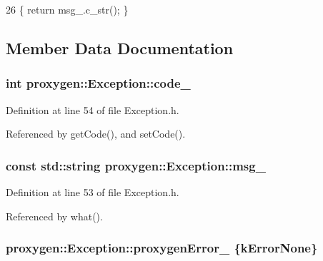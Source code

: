 \begin{DoxyCode}
26 \{ \textcolor{keywordflow}{return} msg_.c\_str(); \}
\end{DoxyCode}


\subsection{Member Data Documentation}
\subsubsection[{code\+\_\+}]{\setlength{\rightskip}{0pt plus 5cm}int proxygen\+::\+Exception\+::code\+\_\+\hspace{0.3cm}{\ttfamily [private]}}\label{classproxygen_1_1Exception_a4adb1db4ba3d299493d948e0af4cbd6c}


Definition at line 54 of file Exception.\+h.



Referenced by get\+Code(), and set\+Code().

\subsubsection[{msg\+\_\+}]{\setlength{\rightskip}{0pt plus 5cm}const std\+::string proxygen\+::\+Exception\+::msg\+\_\+\hspace{0.3cm}{\ttfamily [private]}}\label{classproxygen_1_1Exception_a15e20ea5cdd8fb21db0b17f7a90782a9}


Definition at line 53 of file Exception.\+h.



Referenced by what().

\subsubsection[{proxygen\+Error\+\_\+}]{ proxygen\+::\+Exception\+::proxygen\+Error\+\_\+ \{{\bf k\+Error\+None}\}\hspace{0.3cm}{\ttfamily [private]}}\label{classproxygen_1_1Exception_a715fcc25be1af4a5d6d39a4aa7ec1d14}


